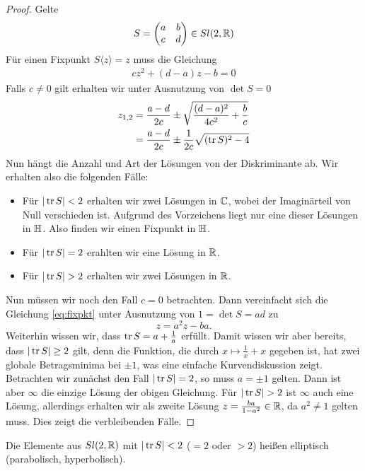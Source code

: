 \begin{proof}
  Gelte
  \[
  S =
  \begin{pmatrix}
    a & b\\
    c & d
  \end{pmatrix} \in Sl(2, \mathbb{R})
  \]
  Für einen Fixpunkt $S \langle z \rangle = z$ muss die Gleichung
  \begin{align}
    \label{eq:fixpkt}
    c z^2 + (d-a)z - b = 0
  \end{align}
  Falls $c \neq 0$ gilt erhalten wir unter Ausnutzung von $\det S = 0$
  \begin{align*}
    z_{1,2} & = \frac{a-d}{2c} \pm \sqrt{\frac{(d-a)^2}{4c^2} +
      \frac{b}{c}} \\
    & = \frac{a-d}{2c} \pm \frac{1}{2c} \sqrt{(\operatorname{tr} S)^2 - 4}
  \end{align*}
  Nun hängt die Anzahl und Art der Lösungen von der Diskriminante
  ab. Wir erhalten also die folgenden Fälle:
  \begin{itemize}
  \item Für $|\operatorname{tr} S| < 2$ erhalten wir zwei Lösungen in $\mathbb{C}$, wobei
    der Imaginärteil von Null verschieden ist. Aufgrund des
    Vorzeichens liegt nur eine dieser Lösungen in $\mathbb{H}$. Also finden
    wir einen Fixpunkt in $\mathbb{H}$.
  \item Für $|\operatorname{tr} S| = 2$ erahlten wir eine Lösung in $\mathbb{R}$.
  \item Für $|\operatorname{tr} S| > 2$ erhalten wir zwei Lösungen in $\mathbb{R}$.
  \end{itemize}
  Nun müssen wir noch den Fall $c = 0$ betrachten. Dann vereinfacht
  sich die Gleichung \eqref{eq:fixpkt} unter Ausnutzung von $1 = \det
  S = ad$ zu
  \[
  z = a^2 z - ba.
  \]
  Weiterhin wissen wir, dass $\operatorname{tr} S = a + \frac{1}{a}$ erfüllt. Damit
  wissen wir aber bereits, dass $|\operatorname{tr} S| \geq 2$ gilt, denn die
  Funktion, die durch $x \mapsto \frac{1}{x} + x$ gegeben ist, hat
  zwei globale Betragsminima bei $\pm 1$, was eine einfache
  Kurvendiskussion zeigt. Betrachten wir zunächst den Fall $|\operatorname{tr} S| =
  2$, so muss $a = \pm 1$ gelten. Dann ist aber $\infty$ die einzige
  Lösung der obigen Gleichung. Für $|\operatorname{tr} S| > 2$ ist $\infty$ auch
  eine Lösung, allerdings erhalten wir als zweite Lösung $z =
  \frac{ba}{1-a^2} \in \mathbb{R}$, da $a^2 \neq 1$ gelten muss. Dies zeigt
  die verbleibenden Fälle.
\end{proof}

\begin{defin}
  Die Elemente aus $Sl(2,\mathbb{R})$ mit $|\operatorname{tr} S| < 2$ ($ = 2$ oder $ > 2$)
  heißen elliptisch (parabolisch, hyperbolisch).
\end{defin}

